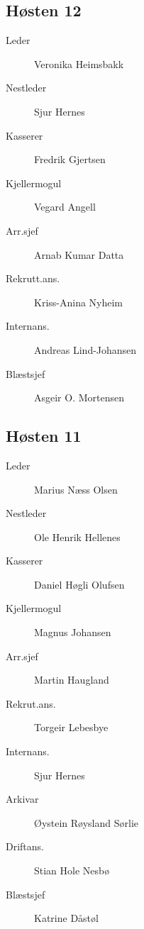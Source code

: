 {\begin{minipage}{0.6\textwidth}
\subsection*{Høsten 12}

\begin{description}
	\item[Leder] Veronika Heimsbakk
	\item[Nestleder] Sjur Hernes
	\item[Kasserer] Fredrik Gjertsen
	\item[Kjellermogul] Vegard Angell
	\item[Arr.sjef] Arnab Kumar Datta
	\item[Rekrutt.ans.] Kriss-Anina Nyheim
	\item[Internans.] Andreas Lind-Johansen
	\item[Blæstsjef] Asgeir O. Mortensen
\end{description}
\subsection*{Høsten 11}

\begin{description}
	\item[Leder] Marius Næss Olsen
	\item[Nestleder] Ole Henrik Hellenes
	\item[Kasserer] Daniel Høgli Olufsen
	\item[Kjellermogul] Magnus Johansen
	\item[Arr.sjef] Martin Haugland
	\item[Rekrut.ans.] Torgeir Lebesbye
	\item[Internans.] Sjur Hernes
	\item[Arkivar] Øystein Røysland Sørlie
	\item[Driftans.] Stian Hole Nesbø
	\item[Blæstsjef] Katrine Dåstøl
\end{description}
\end{minipage}
}





